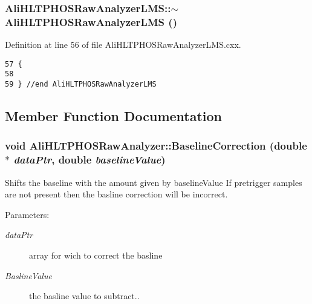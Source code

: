 \subsubsection{\setlength{\rightskip}{0pt plus 5cm}Ali\-HLTPHOSRaw\-Analyzer\-LMS::$\sim${\bf Ali\-HLTPHOSRaw\-Analyzer\-LMS} ()\hspace{0.3cm}{\tt  [virtual]}}\label{classAliHLTPHOSRawAnalyzerLMS_AliHLTPHOSRawAnalyzerLMSa4}




Definition at line 56 of file Ali\-HLTPHOSRaw\-Analyzer\-LMS.cxx.

\footnotesize\begin{verbatim}57 {
58 
59 } //end AliHLTPHOSRawAnalyzerLMS
\end{verbatim}\normalsize 




\subsection{Member Function Documentation}
\subsubsection{\setlength{\rightskip}{0pt plus 5cm}void Ali\-HLTPHOSRaw\-Analyzer::Baseline\-Correction (double $\ast$ {\em data\-Ptr}, double {\em baseline\-Value})\hspace{0.3cm}{\tt  [inherited]}}\label{classAliHLTPHOSRawAnalyzer_AliHLTPHOSRawAnalyzerPeakFindera8}


Shifts the baseline with the amount given by baseline\-Value If pretrigger samples are not present then the basline correction will be incorrect. \begin{Desc}
\item[Parameters:]
\begin{description}
\item[{\em data\-Ptr}]array for wich to correct the basline \item[{\em Basline\-Value}]the basline value to subtract.. \end{description}
\end{Desc}


